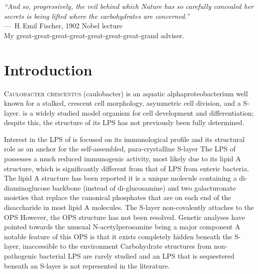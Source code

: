 \acresetall
{}
\label{ch:lps}
\begin{epigraph}
  \emph{``And so, progressively, the veil behind which Nature has so carefully concealed her secrets
    is being lifted where the carbohydrates are concerned.''} \\---~H.\,Emil Fischer, 1902 Nobel
  lecture\\ My great-great-great-great-great-great-great-grand adviser.
\end{epigraph}
\section{Introduction} %
\label{sec:lps_introduction} 
\lettrine[lines=2]{C}{aulobacter crescentus} (\acs{caulobacter}) is an aquatic alphaproteobacterium
well known for a stalked, crescent cell morphology, asymmetric cell division, and a
\ac{S-layer}. \caulobacter is a widely studied model organism for cell development and
differentiation; despite this, the structure of its \ac{LPS} has not previously been fully
determined.

Interest in the \ac{LPS} of \caulobacter is focused on its immunological
profile and its structural role as an anchor for the
self-assembled, para-crystalline \ac{S-layer} The \ac{LPS}
of \caulobacter possesses a much reduced immunogenic activity, most likely due
to its lipid A structure, which is significantly different from that of
\ac{LPS} from enteric bacteria. The lipid A structure has been
reported it is a unique molecule containing a
di-diaminoglucose backbone (instead of di-glucosamine) and two galacturonate
moieties that replace the canonical phosphates that are on each end of the
disaccharide in most lipid A molecules. The \caulobacter \ac{S-layer}
non-covalently attaches to the \ac{OPS} However, the
\ac{OPS} structure has not been resolved. Genetic analyses have pointed
towards the unusual N-acetylperosamine being a major
component A notable feature of this \ac{OPS} is that it
exists completely hidden beneath the \ac{S-layer}, inaccessible to the
environment Carbohydrate structures from non-pathogenic
bacterial \ac{LPS} are rarely studied and an \ac{LPS} that is sequestered
beneath an \ac{S-layer} is not represented in the literature.
 
